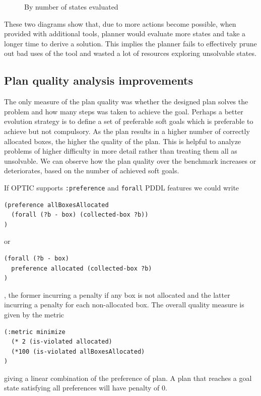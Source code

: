 \documentclass[letterpaper]{article} %
\begin{document}
\begin{figure}
\caption{By number of states evaluated}
\end{figure}
These two diagrams show that, due to more actions become possible, 
when provided with additional tools, planner would evaluate more 
states and take a longer time to derive a solution. This implies 
the planner fails to effectively prune out bad uses of the tool and 
wasted a lot of resources exploring unsolvable states. 
\subsection{Plan quality analysis improvements}
The only measure of the plan quality was whether 
the designed plan solves the problem and how many 
steps was taken to achieve the goal. Perhaps a better 
evolution strategy is to define a set of preferable 
soft goals which is preferable to achieve but not 
compulsory. As the plan results in a higher number 
of correctly allocated boxes, the higher the quality 
of the plan.  This is helpful to analyze problems 
of higher difficulty in more detail rather than 
treating them all as unsolvable. We can observe 
how the plan quality over the benchmark increases 
or deteriorates, based on the number of achieved 
soft goals.  

If OPTIC supports \texttt{:preference} and \texttt{forall}
PDDL features we could write 
\begin{verbatim}
(preference allBoxesAllocated 
  (forall (?b - box) (collected-box ?b))
)  
\end{verbatim}
or 
\begin{verbatim}
(forall (?b - box) 
  preference allocated (collected-box ?b)
)
\end{verbatim}
, the former incurring a penalty if any box is
 not allocated and the latter incurring a 
 penalty for each non-allocated box. 
 The overall quality measure is given by the metric
\begin{verbatim}
(:metric minimize 
  (* 2 (is-violated allocated)
  (*100 (is-violated allBoxesAllocated)
)
\end{verbatim}
 giving a linear combination of the preference of plan. 
 A plan that reaches a goal state satisfying 
 all preferences will have penalty of 0.
 \cite{haslum_2019}



\end{document}
